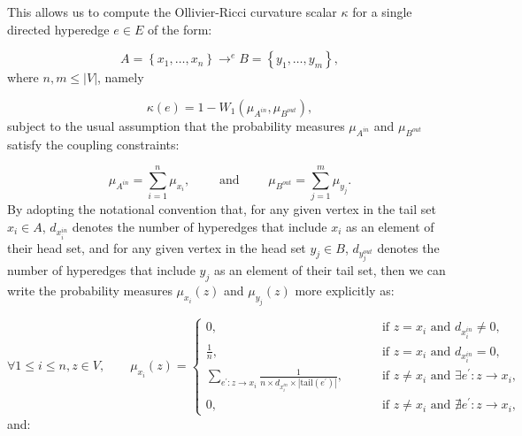 \documentclass{article}
\begin{document}
This allows us to compute the Ollivier-Ricci curvature scalar ${\kappa}$ for a single directed hyperedge ${e \in E}$ of the form:

\begin{equation}
A = \left\lbrace x_1, \dots, x_n \right\rbrace \to^{e} B = \left\lbrace y_1, \dots, y_m \right\rbrace,
\end{equation}
where ${n, m \leq \left\lvert V \right\rvert}$, namely

\begin{equation}
\kappa \left( e \right) = 1 - W_1 \left( \mu_{A^{in}}, \mu_{B^{out}} \right),
\end{equation}
subject to the usual assumption that the probability measures ${\mu_{A^{in}}}$ and ${\mu_{B^{out}}}$ satisfy the coupling constraints:

\begin{equation}
\mu_{A^{in}} = \sum_{i = 1}^{n} \mu_{x_i}, \qquad \text{ and } \qquad \mu_{B^{out}} = \sum_{j = 1}^{m} \mu_{y_j}.
\end{equation}
By adopting the notational convention that, for any given vertex in the tail set ${x_i \in A}$, ${d_{x_{i}^{in}}}$ denotes the number of hyperedges that include ${x_i}$ as an element of their head set, and for any given vertex in the head set ${y_j \in B}$, ${d_{y_{j}^{out}}}$ denotes the number of hyperedges that include ${y_j}$ as an element of their tail set, then we can write the probability measures ${\mu_{x_i} \left( z \right)}$ and ${\mu_{y_j} \left( z \right)}$ more explicitly as:

\begin{equation}
\forall 1 \leq i \leq n, z \in V, \qquad \mu_{x_i} \left( z \right) = \begin{cases}
0, \qquad &\text{ if } z = x_i \text{ and } d_{x_{i}^{in}} \neq 0,\\
\frac{1}{n}, \qquad &\text{ if } z = x_i \text{ and } d_{x_{i}^{in}} = 0,\\
\sum\limits_{e^{\prime} : z \to x_i} \frac{1}{n \times d_{x_{i}^{in}} \times \left\lvert \mathrm{tail} \left( e^{\prime} \right) \right\rvert}, \qquad &\text{ if } z \neq x_i \text{ and } \exists e^{\prime} : z \to x_i,\\
0, \qquad &\text{ if } z \neq x_i \text{ and } \nexists e^{\prime} : z \to x_i,
\end{cases}
\end{equation}
and:
\end{document}
